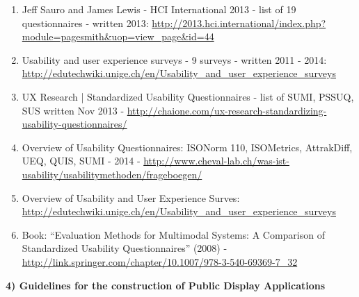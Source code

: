		\begin{enumerate}

		\item Jeff Sauro and James Lewis - HCI International 2013 - list of 19 questionnaires - written 2013: \url{http://2013.hci.international/index.php?module=pagesmith&uop=view_page&id=44}

		\item Usability and user experience surveys - 9 surveys	- written 2011 - 2014: \url{http://edutechwiki.unige.ch/en/Usability_and_user_experience_surveys}

		\item UX Research | Standardized Usability Questionnaires - list of SUMI, PSSUQ, SUS	written Nov 2013 - \url {http://chaione.com/ux-research-standardizing-usability-questionnaires/}
		\item Overview of Usability Questionnaires: ISONorm 110, ISOMetrics, AttrakDiff, UEQ, QUIS, SUMI - 2014 - \url{http://www.cheval-lab.ch/was-ist-usability/usabilitymethoden/frageboegen/}

		\item Overview of Usability and User Experience Surves: \url{http://edutechwiki.unige.ch/en/Usability_and_user_experience_surveys}

		\item Book: ``Evaluation Methods for Multimodal Systems: A Comparison of Standardized Usability Questionnaires'' (2008) - \url{http://link.springer.com/chapter/10.1007/978-3-540-69369-7_32}

		\end{enumerate}




	\textbf{4) Guidelines for the construction of Public Display Applications}

